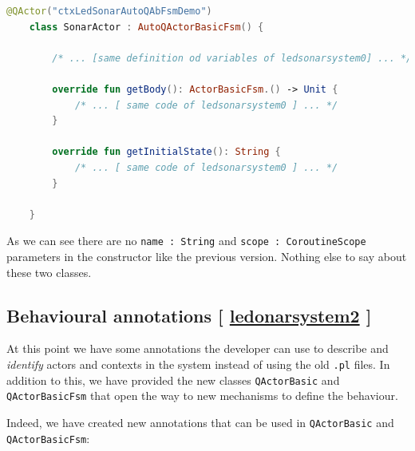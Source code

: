 \begin{lstlisting}[caption=\texttt{SonarActor} (\texttt{ledsonarsystem1}), language=Kotlin]
	@QActor("ctxLedSonarAutoQAbFsmDemo")
	class SonarActor : AutoQActorBasicFsm() {
		
		/* ... [same definition od variables of ledsonarsystem0] ... */
		
		override fun getBody(): ActorBasicFsm.() -> Unit {
			/* ... [ same code of ledsonarsystem0 ] ... */
		}
		
		override fun getInitialState(): String {
			/* ... [ same code of ledsonarsystem0 ] ... */
		}
		
	}
\end{lstlisting}

As we can see there are no \verb|name : String| and \verb|scope : CoroutineScope| parameters in the constructor like the previous version.
Nothing else to say about these two classes.

\subsection{Behavioural annotations [ \href{https://github.com/LM-96/QA-Extensions/tree/main/it.unibo.ledsonardemo2}{\textcolor{Emerald}{\textbf{ledonarsystem2}}} ]}

At this point we have some annotations the developer can use to describe and \textit{identify} actors and contexts in the system instead of using the old \texttt{.pl} files. In addition to this, we have provided the new classes \texttt{QActorBasic} and \texttt{QActorBasicFsm} that open the way to new mechanisms to define the behaviour.

Indeed, we have created new annotations that can be used in \texttt{QActorBasic} and \texttt{QActorBasicFsm}:

